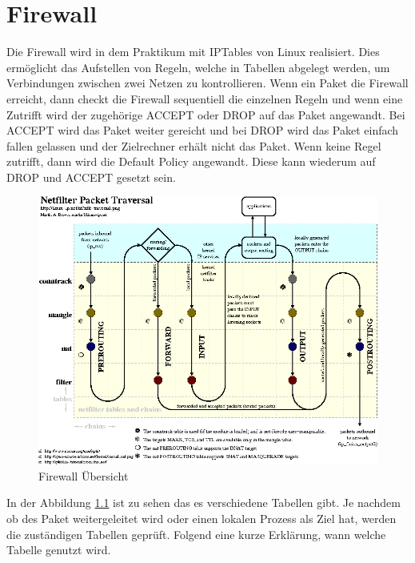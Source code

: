 \chapter{Firewall}
Die Firewall wird in dem Praktikum mit IPTables von Linux realisiert. Dies ermöglicht das Aufstellen von Regeln, welche in Tabellen abgelegt werden, um Verbindungen zwischen zwei Netzen zu kontrollieren. Wenn ein Paket die Firewall erreicht, dann checkt die Firewall sequentiell die einzelnen Regeln und wenn eine Zutrifft wird der zugehörige ACCEPT oder DROP auf das Paket angewandt. Bei ACCEPT wird das Paket weiter gereicht und bei DROP wird das Paket einfach fallen gelassen und der Zielrechner erhält nicht das Paket. Wenn keine Regel zutrifft, dann wird die Default Policy angewandt. Diese kann wiederum auf DROP und ACCEPT gesetzt sein. 
\begin{figure}
	\centering
		\includegraphics[width=1.00\textwidth]{figures/firewall_uebersicht.PNG}
	\caption{Firewall Übersicht \cite{linux-ip}}
	\label{fig:firewall_uebersicht}
\end{figure}
In der Abbildung \ref{fig:firewall_uebersicht} ist zu sehen das es verschiedene Tabellen gibt. Je nachdem ob des Paket weitergeleitet wird oder einen lokalen Prozess als Ziel hat, werden die zuständigen Tabellen geprüft. Folgend eine kurze Erklärung, wann welche Tabelle genutzt wird.
